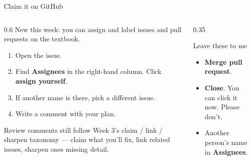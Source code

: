 \documentclass[9pt,aspectratio=169]{beamer}
\begin{document}
\begin{frame}{Claim it on GitHub}
    \begin{columns}[T]
        \begin{column}{0.6\textwidth}
            New this week: you can assign and label issues and pull requests on the textbook.

            \medskip

            \begin{enumerate}\small
                \item Open the issue.
                \item Find \textbf{Assignees} in the right-hand column. Click \textbf{assign yourself}.
                \item If another name is there, pick a different issue.
                \item Write a comment with your plan.
            \end{enumerate}

            \medskip

            Review comments still follow Week 3's claim / link / sharpen taxonomy --- claim what you'll fix, link related issues, sharpen ones missing detail.
        \end{column}
        \begin{column}{0.35\textwidth}
            \begin{alertblock}{Leave these to me}
                \small
                \begin{itemize}
                    \item \textbf{Merge pull request}.
                    \item \textbf{Close}. You can click it now. Please don't.
                    \item Another person's name in \textbf{Assignees}.
                \end{itemize}
            \end{alertblock}
        \end{column}
    \end{columns}
\end{frame}
\end{document}
